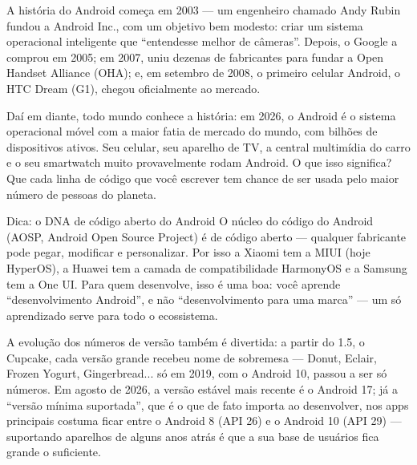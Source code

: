 


A história do Android começa em 2003 — um engenheiro chamado Andy Rubin fundou a Android Inc., com um objetivo bem modesto: criar um sistema operacional inteligente que “entendesse melhor de câmeras”. Depois, o Google a comprou em 2005; em 2007, uniu dezenas de fabricantes para fundar a Open Handset Alliance (OHA); e, em setembro de 2008, o primeiro celular Android, o HTC Dream (G1), chegou oficialmente ao mercado.

Daí em diante, todo mundo conhece a história: em 2026, o Android é o sistema operacional móvel com a maior fatia de mercado do mundo, com bilhões de dispositivos ativos. Seu celular, seu aparelho de TV, a central multimídia do carro e o seu smartwatch muito provavelmente rodam Android. O que isso significa? Que cada linha de código que você escrever tem chance de ser usada pelo maior número de pessoas do planeta.

\begin{tcbinfo}{Dica: o DNA de código aberto do Android}
O núcleo do código do Android (AOSP, Android Open Source Project) é de código aberto — qualquer fabricante pode pegar, modificar e personalizar. Por isso a Xiaomi tem a MIUI (hoje HyperOS), a Huawei tem a camada de compatibilidade HarmonyOS e a Samsung tem a One UI. Para quem desenvolve, isso é uma boa: você aprende “desenvolvimento Android”, e não “desenvolvimento para uma marca” — um só aprendizado serve para todo o ecossistema.

\end{tcbinfo}

A evolução dos números de versão também é divertida: a partir do 1.5, o Cupcake, cada versão grande recebeu nome de sobremesa — Donut, Eclair, Frozen Yogurt, Gingerbread... só em 2019, com o Android 10, passou a ser só números. Em agosto de 2026, a versão estável mais recente é o Android 17; já a “versão mínima suportada”, que é o que de fato importa ao desenvolver, nos apps principais costuma ficar entre o Android 8 (API 26) e o Android 10 (API 29) — suportando aparelhos de alguns anos atrás é que a sua base de usuários fica grande o suficiente.

